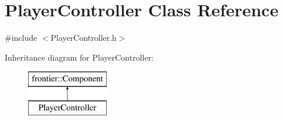 \hypertarget{class_player_controller}{}\section{Player\+Controller Class Reference}
\label{class_player_controller}


{\ttfamily \#include $<$Player\+Controller.\+h$>$}

Inheritance diagram for Player\+Controller\+:\begin{figure}[H]
\begin{center}
\leavevmode
\includegraphics[height=2.000000cm]{class_player_controller}
\end{center}
\end{figure}
